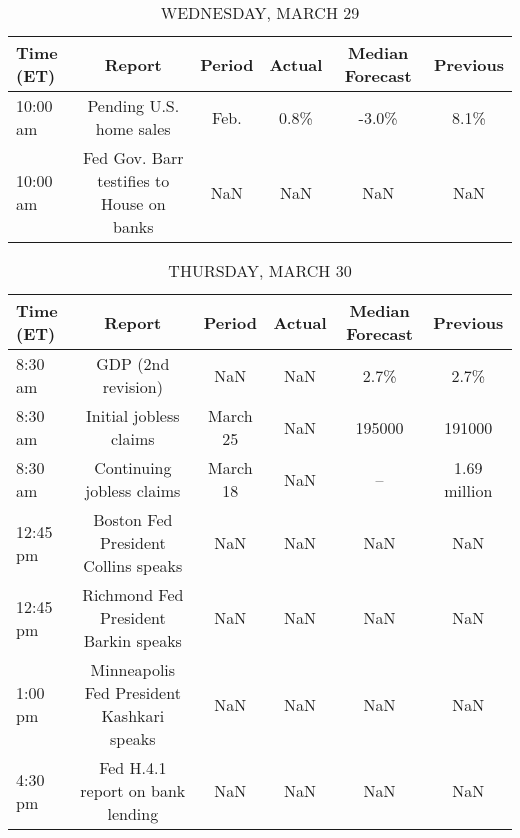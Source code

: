 \documentclass{article}%
\begin{document}
\begin{table}[htbp]%
\caption{WEDNESDAY, MARCH 29}%
\centering%
\begin{adjustbox}{width=1\textwidth}%
\begin{tabular}{lccccc}
\toprule
Time (ET) &                                    Report & Period & Actual & Median Forecast & Previous \\
\midrule
 10:00 am &                   Pending U.S. home sales &   Feb. &   0.8\% &           -3.0\% &     8.1\% \\
 10:00 am & Fed Gov. Barr testifies to House on banks &    NaN &    NaN &             NaN &      NaN \\
\bottomrule
\end{tabular}
%
\end{adjustbox}%
\end{table}

%


\begin{table}[htbp]%
\caption{THURSDAY, MARCH 30}%
\centering%
\begin{adjustbox}{width=1\textwidth}%
\begin{tabular}{lccccc}
\toprule
Time (ET) &                                    Report &   Period & Actual & Median Forecast &     Previous \\
\midrule
  8:30 am &                        GDP (2nd revision) &      NaN &    NaN &            2.7\% &         2.7\% \\
  8:30 am &                    Initial jobless claims & March 25 &    NaN &          195000 &       191000 \\
  8:30 am &                 Continuing jobless claims & March 18 &    NaN &              -- & 1.69 million \\
 12:45 pm &       Boston Fed President Collins speaks &      NaN &    NaN &             NaN &          NaN \\
 12:45 pm &      Richmond Fed President Barkin speaks &      NaN &    NaN &             NaN &          NaN \\
  1:00 pm & Minneapolis Fed President Kashkari speaks &      NaN &    NaN &             NaN &          NaN \\
  4:30 pm &          Fed H.4.1 report on bank lending &      NaN &    NaN &             NaN &          NaN \\
\bottomrule
\end{tabular}
%
\end{adjustbox}%
\end{table}
\end{document}
